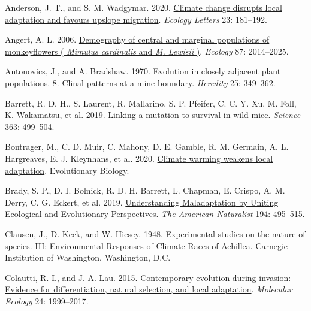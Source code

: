\documentclass[
  12pt,
]{article}
\newlength{\cslhangindent}
\newlength{\cslentryspacingunit} %
\newenvironment{CSLReferences}[2] %
 {%
  \setlength{\parindent}{0pt}
  \ifodd #1
  \let\oldpar\par
  \def\par{\hangindent=\cslhangindent\oldpar}
  \fi
  \setlength{\parskip}{#2\cslentryspacingunit}
 }%
 {}
\begin{document}
\hypertarget{refs}{}
\begin{CSLReferences}{1}{0}
\leavevmode{}%
Anderson, J. T., and S. M. Wadgymar. 2020. \href{https://doi.org/10.1111/ele.13427}{Climate change disrupts local adaptation and favours upslope migration}. \emph{Ecology Letters} 23: 181--192.

\leavevmode{}%
Angert, A. L. 2006. \href{https://doi.org/10.1890/0012-9658(2006)87\%5B2014:DOCAMP\%5D2.0.CO;2}{Demography of central and marginal populations of monkeyflowers ( \emph{{Mimulus} cardinalis} and \emph{{M}. Lewisii} )}. \emph{Ecology} 87: 2014--2025.

\leavevmode{}%
Antonovics, J., and A. Bradshaw. 1970. Evolution in closely adjacent plant populations. 8. {Clinal} patterns at a mine boundary. \emph{Heredity} 25: 349--362.

\leavevmode{}%
Barrett, R. D. H., S. Laurent, R. Mallarino, S. P. Pfeifer, C. C. Y. Xu, M. Foll, K. Wakamatsu, et al. 2019. \href{https://doi.org/10.1126/science.aav3824}{Linking a mutation to survival in wild mice}. \emph{Science} 363: 499--504.

\leavevmode{}%
Bontrager, M., C. D. Muir, C. Mahony, D. E. Gamble, R. M. Germain, A. L. Hargreaves, E. J. Kleynhans, et al. 2020. \href{https://doi.org/10.1101/2020.11.01.364349}{Climate warming weakens local adaptation}. Evolutionary Biology.

\leavevmode{}%
Brady, S. P., D. I. Bolnick, R. D. H. Barrett, L. Chapman, E. Crispo, A. M. Derry, C. G. Eckert, et al. 2019. \href{https://doi.org/10.1086/705020}{Understanding {Maladaptation} by {Uniting} {Ecological} and {Evolutionary} {Perspectives}}. \emph{The American Naturalist} 194: 495--515.

\leavevmode{}%
Clausen, J., D. Keck, and W. Hiesey. 1948. Experimental studies on the nature of species. {III}: {Environmental} {Responses} of {Climate} {Races} of {Achillea}. Carnegie Institution of Washington, Washington, D.C.

\leavevmode{}%
Colautti, R. I., and J. A. Lau. 2015. \href{https://doi.org/10.1111/mec.13162}{Contemporary evolution during invasion: Evidence for differentiation, natural selection, and local adaptation}. \emph{Molecular Ecology} 24: 1999--2017.


\end{CSLReferences}
\end{document}
